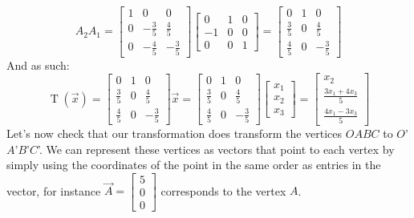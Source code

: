 \documentclass[12pt, letterpaper]{article}
\theoremstyle{statement}
\theoremstyle{statement}
\begin{document}
    $$
    A_2A_1 = 
    \begin{bmatrix}
    1 & 0 & 0\\
    0 & -\frac{3}{5}& \frac{4}{5} \\
    0 & -\frac{4}{5} & -\frac{3}{5} 
    \end{bmatrix}
    \begin{bmatrix}
    0 & 1 & 0 \\
    -1 & 0 & 0 \\
    0 & 0 & 1
    \end{bmatrix}
    =
    \begin{bmatrix}
    0 & 1 & 0 \\
    \frac{3}{5} & 0 & \frac{4}{5} \\
    \frac{4}{5} & 0 & -\frac{3}{5}
    \end{bmatrix}
    $$
    And as such:
    $$
    \operatorname{T}(\Vec{x})
    =
    \begin{bmatrix}
    0 & 1 & 0 \\
    \frac{3}{5} & 0 & \frac{4}{5} \\
    \frac{4}{5} & 0 & -\frac{3}{5}
    \end{bmatrix}
    \Vec{x}
    =
    \begin{bmatrix}
    0 & 1 & 0 \\
    \frac{3}{5} & 0 & \frac{4}{5} \\
    \frac{4}{5} & 0 & -\frac{3}{5}
    \end{bmatrix}
    \begin{bmatrix}
    x_1 \\ x_2 \\ x_3
    \end{bmatrix}
    =
    \begin{bmatrix}
    x_2 \\
    \frac{3x_1+4x_3}{5} \\
    \frac{4x_1-3x_3}{5}
    \end{bmatrix}
    $$
    Let's now check that our transformation does transform the vertices $OABC$ to $O$'$A$'$B$'$C$'. We can represent these vertices as vectors that point to each vertex by simply using the coordinates of the point in the same order as entries in the vector, for instance $\Vec{A}=\begin{bmatrix} 5 \\0\\0\end{bmatrix}$ corresponds to the vertex $A$. 
    
\end{document}
